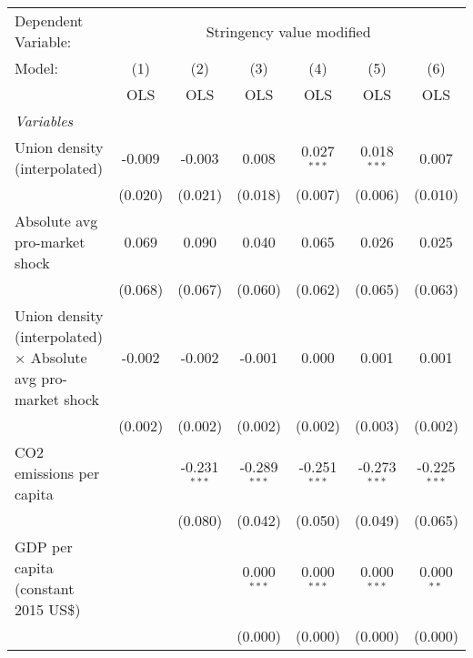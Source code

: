
\begingroup
\centering
\begin{tabular}{lcccccc}
   \toprule
   Dependent Variable: & \multicolumn{6}{c}{Stringency value modified}\\
   Model:                                                               & (1)     & (2)            & (3)            & (4)            & (5)            & (6)\\  
                                                                        &  OLS    & OLS            & OLS            & OLS            & OLS            & OLS\\  
   \midrule
   \emph{Variables}\\
   Union density (interpolated)                                         & -0.009  & -0.003         & 0.008          & 0.027$^{***}$  & 0.018$^{***}$  & 0.007\\   
                                                                        & (0.020) & (0.021)        & (0.018)        & (0.007)        & (0.006)        & (0.010)\\   
   Absolute avg pro-market shock                                        & 0.069   & 0.090          & 0.040          & 0.065          & 0.026          & 0.025\\   
                                                                        & (0.068) & (0.067)        & (0.060)        & (0.062)        & (0.065)        & (0.063)\\   
   Union density (interpolated) $\times$ Absolute avg pro-market shock  & -0.002  & -0.002         & -0.001         & 0.000          & 0.001          & 0.001\\   
                                                                        & (0.002) & (0.002)        & (0.002)        & (0.002)        & (0.003)        & (0.002)\\   
   CO2 emissions per capita                                             &         & -0.231$^{***}$ & -0.289$^{***}$ & -0.251$^{***}$ & -0.273$^{***}$ & -0.225$^{***}$\\   
                                                                        &         & (0.080)        & (0.042)        & (0.050)        & (0.049)        & (0.065)\\   
   GDP per capita (constant 2015 US\$)                                  &         &                & 0.000$^{***}$  & 0.000$^{***}$  & 0.000$^{***}$  & 0.000$^{**}$\\   
                                                                        &         &                & (0.000)        & (0.000)        & (0.000)        & (0.000)\\   

\end{tabular}
